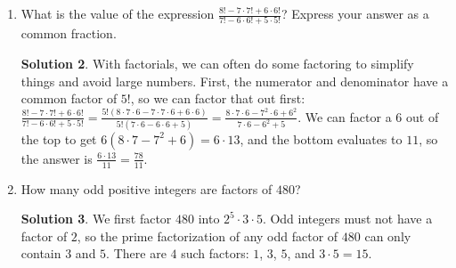 \documentclass{article}
\theoremstyle{definition}
\newtheorem*{solution}{Solution}
\begin{document}
\begin{multicols}{2}
\begin{enumerate}
\begin{solution}
                can be chosen in $10$ ways. The total number is thus $10 \cdot 9 = 
                90$.
            \end{solution}
        \item What is the value of the expression $\frac{8! - 7 \cdot 7! + 6 \cdot 
            6!} {7! - 6 \cdot 6! + 5 \cdot 5!}$? Express your answer as a common 
            fraction.
            \begin{solution}
                With factorials, we can often do some factoring to simplify things 
                and avoid large numbers. First, the numerator and denominator have a 
                common factor of $5!$, so we can factor that out first: $\frac{8! - 
                7 \cdot 7! + 6 \cdot 6!}{7! - 6 \cdot 6! + 5 \cdot 5!} = \frac{5!(8 
                \cdot 7 \cdot 6 - 7 \cdot 7 \cdot 6 + 6 \cdot 6)}{5!(7 \cdot 6 - 6 
                \cdot 6 + 5)} = \frac{8 \cdot 7 \cdot 6 - 7^2 \cdot 6 + 6^2}{7 \cdot 
                6 - 6^2 + 5}$. We can factor a $6$ out of the top to get $6(8 \cdot 
                7 - 7^2 + 6) = 6 \cdot 13$, and the bottom evaluates to $11$, so the 
                answer is $\frac{6 \cdot 13}{11} = \frac{78}{11}$.
            \end{solution}
        \item How many odd positive integers are factors of $480$?
            \begin{solution}
                We first factor $480$ into $2^5 \cdot 3 \cdot 5$. Odd integers must 
                not have a factor of $2$, so the prime factorization of any odd 
                factor of $480$ can only contain $3$ and $5$. There are $4$ such 
                factors: $1$, $3$, $5$, and $3 \cdot 5 = 15$.
            \end{solution}
    \end{enumerate}
\end{multicols}
\end{document}
